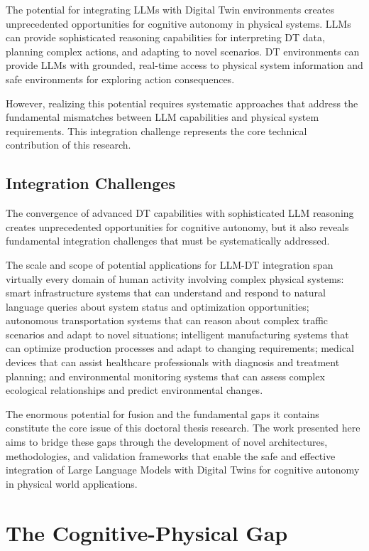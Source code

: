 The potential for integrating LLMs with Digital Twin environments creates unprecedented opportunities for cognitive autonomy in physical systems. LLMs can provide sophisticated reasoning capabilities for interpreting DT data, planning complex actions, and adapting to novel scenarios. DT environments can provide LLMs with grounded, real-time access to physical system information and safe environments for exploring action consequences.

However, realizing this potential requires systematic approaches that address the fundamental mismatches between LLM capabilities and physical system requirements. This integration challenge represents the core technical contribution of this research.

\subsection{Integration Challenges}

The convergence of advanced DT capabilities with sophisticated LLM reasoning creates unprecedented opportunities for cognitive autonomy, but it also reveals fundamental integration challenges that must be systematically addressed.

The scale and scope of potential applications for LLM-DT integration span virtually every domain of human activity involving complex physical systems: smart infrastructure systems that can understand and respond to natural language queries about system status and optimization opportunities; autonomous transportation systems that can reason about complex traffic scenarios and adapt to novel situations; intelligent manufacturing systems that can optimize production processes and adapt to changing requirements; medical devices that can assist healthcare professionals with diagnosis and treatment planning; and environmental monitoring systems that can assess complex ecological relationships and predict environmental changes.

The enormous potential for fusion and the fundamental gaps it contains constitute the core issue of this doctoral thesis research. The work presented here aims to bridge these gaps through the development of novel architectures, methodologies, and validation frameworks that enable the safe and effective integration of Large Language Models with Digital Twins for cognitive autonomy in physical world applications.

\section{The Cognitive-Physical Gap}

